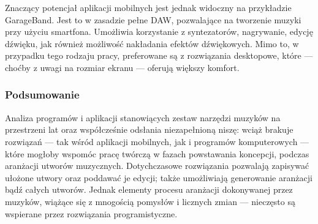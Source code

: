 \documentclass[12pt]{article}
\begin{document}
Znaczący potencjał aplikacji mobilnych jest jednak widoczny na przykładzie GarageBand. Jest to w zasadzie pełne DAW,
pozwalające na tworzenie muzyki przy użyciu smartfona. Umożliwia korzystanie z syntezatorów, nagrywanie, edycję dźwięku,
jak również możliwość nakładania efektów dźwiękowych. Mimo to, w przypadku tego rodzaju pracy, preferowane są
z rozwiązania desktopowe, które — choćby z uwagi na rozmiar ekranu — oferują większy komfort.

\subsubsection{Podsumowanie}
Analiza programów i aplikacji stanowiących zestaw narzędzi muzyków na przestrzeni lat oraz współcześnie
odsłania niezapełnioną niszę: wciąż brakuje rozwiązań — tak wśród aplikacji mobilnych, jak i programów komputerowych —
które mogłoby wspomóc pracę twórczą w fazach powstawania koncepcji, podczas aranżacji utworów muzycznych. Dotychczasowe
rozwiązania pozwalają zapisywać ułożone utwory oraz poddawać je edycji; także umożliwiają generowanie aranżacji bądź całych
utworów. Jednak elementy procesu aranżacji dokonywanej przez muzyków, wiążące się z mnogością pomysłów i licznych zmian —
nieczęsto są wspierane przez rozwiązania programistyczne.
\end{document}
